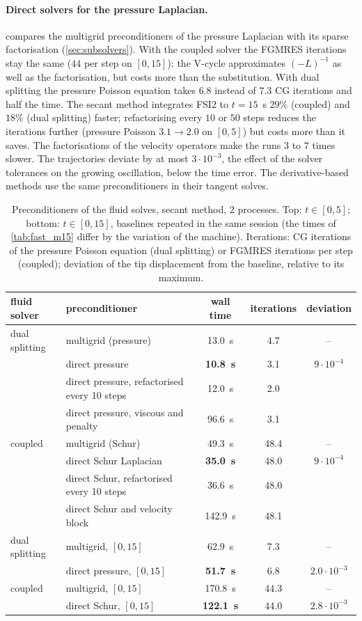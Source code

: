 \documentclass[11pt,a4paper]{article}
\theoremstyle{definition}
\theoremstyle{remark}
\begin{document}
\paragraph{Direct solvers for the pressure Laplacian.}  compares the multigrid
preconditioners of the pressure Laplacian with its sparse factorisation (\cref{sec:subsolvers}).
With the coupled solver the FGMRES iterations stay the same ($44$ per step on $[0,15]$): the
V-cycle approximates $(-L)^{-1}$ as well as the factorisation, but costs more than the
substitution.
With dual splitting the pressure Poisson equation takes $6.8$ instead of $7.3$ CG iterations and
half the time. The secant method integrates FSI2 to $t=15$~s $29\%$ (coupled) and $18\%$ (dual
splitting) faster; refactorising every $10$ or $50$ steps reduces the iterations further (pressure
Poisson $3.1\to2.0$ on $[0,5]$) but costs more than it saves. The factorisations of the velocity
operators make the runs $3$ to $7$ times slower. The trajectories deviate by at most
$3\cdot10^{-3}$, the effect of the solver tolerances on the growing oscillation, below the time
error. The derivative-based methods use the same preconditioners in their tangent solves.

\begin{table}[ht]\centering
\caption{Preconditioners of the fluid solves, secant method, $2$ processes. Top: $t\in[0,5]$;
bottom: $t\in[0,15]$, baselines repeated in the same session (the times of \cref{tab:fast_m15}
differ by the variation of the machine). Iterations: CG iterations of the pressure Poisson equation
(dual splitting) or FGMRES iterations per step (coupled); deviation of the tip displacement from
the baseline, relative to its maximum.}
\label{tab:fast_fluid}
\begin{tabular}{llccc}
\toprule
fluid solver & preconditioner & wall time & iterations & deviation\\
\midrule
dual splitting & multigrid (pressure) & 13.0~s & 4.7 & --\\
 & direct pressure & \textbf{10.8~s} & 3.1 & $9\cdot10^{-4}$\\
 & direct pressure, refactorised every 10 steps & 12.0~s & 2.0 & \\
 & direct pressure, viscous and penalty & 96.6~s & 3.1 & \\
coupled & multigrid (Schur) & 49.3~s & 48.4 & --\\
 & direct Schur Laplacian & \textbf{35.0~s} & 48.0 & $9\cdot10^{-4}$\\
 & direct Schur, refactorised every 10 steps & 36.6~s & 48.0 & \\
 & direct Schur and velocity block & 142.9~s & 48.1 & \\
\midrule
dual splitting & multigrid, $[0,15]$ & 62.9~s & 7.3 & --\\
 & direct pressure, $[0,15]$ & \textbf{51.7~s} & 6.8 & $2.0\cdot10^{-3}$\\
coupled & multigrid, $[0,15]$ & 170.8~s & 44.3 & --\\
 & direct Schur, $[0,15]$ & \textbf{122.1~s} & 44.0 & $2.8\cdot10^{-3}$\\
\bottomrule
\end{tabular}
\end{table}
\end{document}

